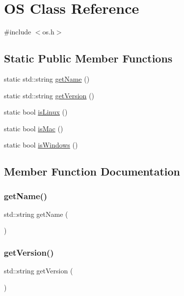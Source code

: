 \hypertarget{classOS}{}\section{OS Class Reference}
\label{classOS}


{\ttfamily \#include $<$os.\+h$>$}

\subsection*{Static Public Member Functions}
\begin{DoxyCompactItemize}
\item 
static std\+::string \mbox{\hyperlink{classOS_ac0fc966d4386ddb71d99361e3fccb311}{get\+Name}} ()
\item 
static std\+::string \mbox{\hyperlink{classOS_aee3bd62c6c84d746802c115f5d4c1519}{get\+Version}} ()
\item 
static bool \mbox{\hyperlink{classOS_a788e423282dd2f38315986d30bbae63b}{is\+Linux}} ()
\item 
static bool \mbox{\hyperlink{classOS_a78ccfa2165be4fedb1caa2aca444568c}{is\+Mac}} ()
\item 
static bool \mbox{\hyperlink{classOS_a98203f29153132a6da56b0ff5634bdb3}{is\+Windows}} ()
\end{DoxyCompactItemize}


\subsection{Member Function Documentation}
\mbox{\label{classOS_ac0fc966d4386ddb71d99361e3fccb311}} 
\subsubsection{\texorpdfstring{get\+Name()}{getName()}}
{\footnotesize\ttfamily std\+::string get\+Name (\begin{DoxyParamCaption}{ }\end{DoxyParamCaption})\hspace{0.3cm}{\ttfamily [static]}}

\mbox{\label{classOS_aee3bd62c6c84d746802c115f5d4c1519}} 
\subsubsection{\texorpdfstring{get\+Version()}{getVersion()}}
{\footnotesize\ttfamily std\+::string get\+Version (\begin{DoxyParamCaption}{ }\end{DoxyParamCaption})\hspace{0.3cm}{\ttfamily [static]}}


